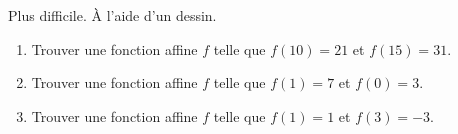 
\begin{exercice}\label{exosmath-0503}

    Plus difficile. À l'aide d'un dessin.
    \begin{enumerate}
        \item
            Trouver une fonction affine \( f\) telle que \( f(10)=21\) et \( f(15)=31\).
        \item
            Trouver une fonction affine \( f\) telle que \( f(1)=7\) et \( f(0)=3\).
        \item
            Trouver une fonction affine \( f\) telle que \( f(1)=1\) et \( f(3)=-3\).
    \end{enumerate}

\end{exercice}
